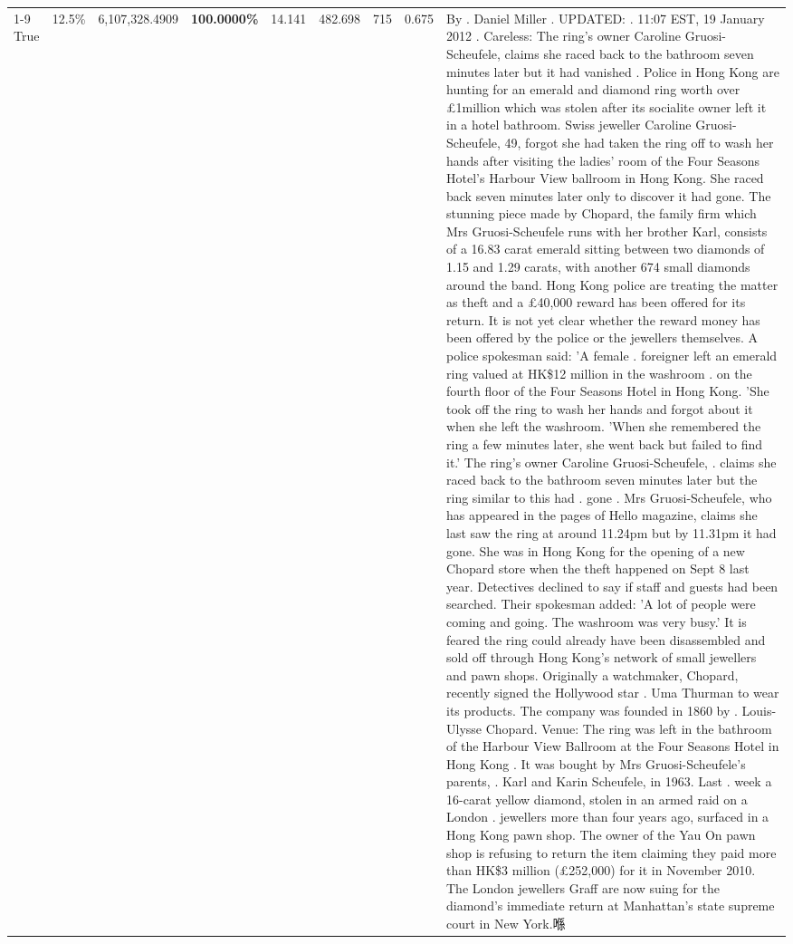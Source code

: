 \begin{table}[H]
\begin{tabular}{lllrlllll}
\cline{1-9}
True & 12.5\% & 6,107,328.4909 & \bfseries \color{red} 100.0000\% & 14.141 & 482.698 & 715 & 0.675 & By . Daniel Miller . UPDATED: . 11:07 EST, 19 January 2012 . Careless: The ring's owner Caroline Gruosi-Scheufele, claims she raced back to the bathroom seven minutes later but it had vanished . Police in Hong Kong are hunting for an emerald and diamond ring worth over £1million which was stolen after its socialite owner left it in a hotel bathroom. Swiss jeweller Caroline Gruosi-Scheufele, 49, forgot she had taken the ring off to wash her hands after visiting the ladies' room of the Four Seasons Hotel's Harbour View ballroom in Hong Kong. She raced back seven minutes later only to discover it had gone. The stunning piece made by Chopard, the family firm which Mrs Gruosi-Scheufele runs with her brother Karl, consists of a 16.83 carat emerald sitting between two diamonds of 1.15 and 1.29 carats, with another 674 small diamonds around the band. Hong Kong police are treating the matter as theft and a £40,000 reward has been offered for its return. It is not yet clear whether the reward money has been offered by the police or the jewellers themselves. A police spokesman said: 'A female . foreigner left an emerald ring valued at HK\$12 million in the washroom . on the fourth floor of the Four Seasons Hotel in Hong Kong. 'She took off the ring to wash her hands and forgot about it when she left the washroom. 'When she remembered the ring a few minutes later, she went back but failed to find it.' The ring's owner Caroline Gruosi-Scheufele, . claims she raced back to the bathroom seven minutes later but the ring similar to this had . gone . Mrs Gruosi-Scheufele, who has appeared in the pages of Hello magazine, claims she last saw the ring at around 11.24pm but by 11.31pm it had gone. She was in Hong Kong for the opening of a new Chopard store when the theft happened on Sept 8 last year. Detectives declined to say if staff and guests had been searched. Their spokesman added: 'A lot of people were coming and going. The washroom was very busy.' It is feared the ring could already have been disassembled and sold off through Hong Kong's network of small jewellers and pawn shops. Originally a watchmaker, Chopard, recently signed the Hollywood star . Uma Thurman to wear its products. The company was founded in 1860 by . Louis-Ulysse Chopard. Venue: The ring was left in the bathroom of the Harbour View Ballroom at the Four Seasons Hotel in Hong Kong . It was bought by Mrs Gruosi-Scheufele's  parents, . Karl and Karin Scheufele, in 1963. Last . week a 16-carat yellow diamond, stolen in an armed raid on a London . jewellers more than four years ago, surfaced in a Hong Kong pawn shop. The owner of the Yau On pawn shop is refusing to return the item claiming they paid more than HK\$3 million (£252,000) for it in November 2010. The London jewellers Graff are now suing for the diamond’s immediate return at Manhattan’s state supreme court in New York.喺 \\

\end{tabular}
\end{table}
